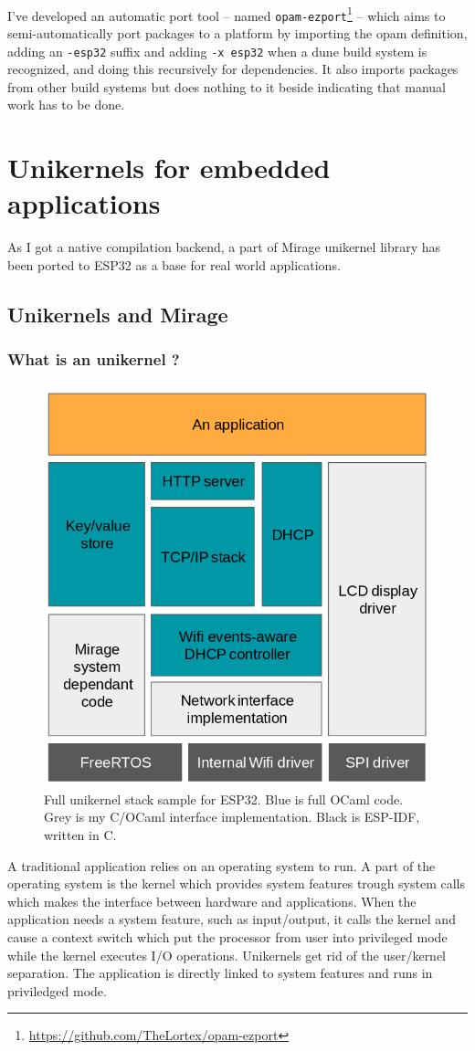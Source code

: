 \documentclass[a4paper]{article}
\begin{document}
\paragraph{}
I've developed an automatic port tool -- named \texttt{opam-ezport}\footnote{\url{https://github.com/TheLortex/opam-ezport}} -- which aims to semi-automatically port packages to a platform by importing the opam definition, adding an \texttt{-esp32} suffix and adding \texttt{-x esp32} when a dune build system is recognized, and doing this recursively for dependencies. It also imports packages from other build systems but does nothing to it beside indicating that manual work has to be done.

\section{Unikernels for embedded applications}
As I got a native compilation backend, a part of Mirage unikernel library has been ported to ESP32 as a base for real world applications.
\subsection{Unikernels and Mirage}
\subsubsection{What is an unikernel ?}
\paragraph{}
\begin{figure}
\includegraphics[width=0.4\columnwidth]{app.png}
\caption{Full unikernel stack sample for ESP32. Blue is full OCaml code. Grey is my C/OCaml interface implementation. Black is ESP-IDF, written in C.}
\end{figure}
A traditional application relies on an operating system to run. A part of the operating system is the kernel which provides system features trough system calls which makes the interface between hardware and applications. When the application needs a system feature, such as input/output, it calls the kernel and cause a context switch which put the processor from user into privileged mode while the kernel executes I/O operations. Unikernels get rid of the user/kernel separation. The application is directly linked to system features and runs in priviledged mode. 
\end{document}
